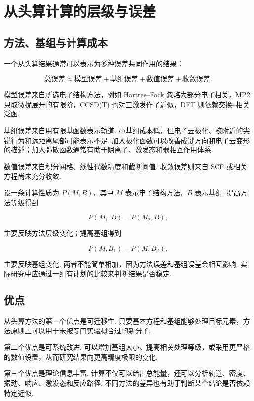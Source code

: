 \documentclass[UTF8,11pt,a4paper,openany]{ctexbook}
\begin{document}
\section{从头算计算的层级与误差}

\subsection{方法、基组与计算成本}

一个从头算结果通常可以表示为多种误差共同作用的结果：

\[
\text{总误差}
\approx
\text{模型误差}
+
\text{基组误差}
+
\text{数值误差}
+
\text{收敛误差}.
\]

模型误差来自所选电子结构方法，例如 Hartree--Fock 忽略大部分电子相关，MP2 只取微扰展开的有限阶，CCSD(T) 也对三激发作了近似，DFT 则依赖交换--相关泛函. 

基组误差来自用有限基函数表示轨道. 小基组成本低，但电子云极化、核附近的尖锐行为和远距离尾部可能表示不足. 加入极化函数可以改善成键方向和电子云变形的描述；加入弥散函数通常有助于阴离子、激发态和弱相互作用体系. 

数值误差来自积分网格、线性代数精度和截断阈值. 收敛误差则来自 SCF 或相关方程尚未充分收敛. 

\begin{derivationbox}
设一条计算性质为 $P(M,B)$，其中 $M$ 表示电子结构方法，$B$ 表示基组. 提高方法等级得到

\[
P(M_1,B)-P(M_2,B),
\]

主要反映方法层级变化；提高基组得到

\[
P(M,B_1)-P(M,B_2),
\]

主要反映基组变化. 两者不能简单相加，因为方法误差和基组误差会相互影响. 实际研究中应通过一组有计划的比较来判断结果是否稳定. 
\end{derivationbox}

\subsection{优点}

从头算方法的第一个优点是可迁移性. 只要基本方程和基组能够处理目标元素，方法原则上可以用于未被专门实验拟合过的新分子. 

第二个优点是可系统改进. 可以增加基组大小、提高相关处理等级，或采用更严格的数值设置，从而研究结果向更高精度极限的变化. 

第三个优点是理论信息丰富. 计算不仅可以给出总能量，还可以分析轨道、密度、振动、响应、激发态和反应路径. 不同方法的差异也有助于判断某个结论是否依赖特定近似. 
\end{document}
